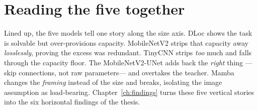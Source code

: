 \section{Reading the five together}
\label{sec:arch:together}

Lined up, the five models tell one story along the size axis. DLoc shows the task is solvable but
over-provisions capacity. MobileNetV2 strips that capacity away \emph{losslessly}, proving the excess
was redundant. TinyCNN strips \emph{too} much and falls through the capacity floor. The
MobileNetV2-UNet adds back the \emph{right} thing ---skip connections, not raw parameters--- and
overtakes the teacher. Mamba changes the \emph{framing} instead of the size and breaks, isolating the
image assumption as load-bearing. Chapter~\ref{ch:findings} turns these five vertical stories into the
six horizontal findings of the thesis.
